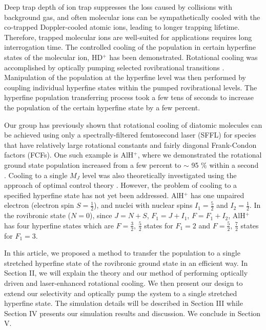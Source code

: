 \documentclass[nofootinbib,aip,jcp,reprint]{revtex4-1}
\begin{document}
Deep trap depth of ion trap suppresses the loss caused by collisions with background gas, and often molecular ions can be sympathetically cooled with the co-trapped Doppler-cooled atomic ions, leading to longer trapping lifetime. Therefore, trapped molecular ions are well-suited for applications requires long interrogation time. The controlled cooling of the population in certain hyperfine states of the molecular ion, HD$^+$ has been demonstrated\cite{bressel2012manipulation}. Rotational cooling was accomplished by optically pumping selected rovibrational transitions \cite{schneider2010all}. Manipulation of the population at the hyperfine level was then performed by coupling individual hyperfine states within the pumped rovibrational levels. The hyperfine population transferring process took a few tens of seconds to increase the population of the certain hyperfine state by a few percent.\par
Our group has previously shown that rotational cooling of diatomic molecules can be achieved using only a spectrally-filtered femtosecond laser (SFFL) for species that have relatively large rotational constants and fairly diagonal Frank-Condon factors (FCFs)\cite{lien2011optical}. One such example is AlH$^+$, where we demonstrated the rotational ground state population increased from a few percent to $\sim$ 95 $\%$ within a second \cite{lien2014broadband}. Cooling to a single $M_{J}$ level was also theoretically investigated using the approach of optimal control theory \cite{aroch2018optimizing}. However, the problem of cooling to a specified hyperfine state has not yet been addressed. AlH$^+$ has one unpaired electron (electron spin $S=\frac{1}{2}$), and nuclei with nuclear spins $I_{1}=\frac{5}{2}$ and $I_{2}=\frac{1}{2}$. In the rovibronic state ($N=0$), since $J=N+S$, $F_{1}=J+I_{1}$, $F=F_{1}+I_{2}$, AlH$^{+}$ has four hyperfine states which are $F=\frac{3}{2},\, \frac{5}{2}$ states for $F_{1}=2$ and $F=\frac{5}{2},\, \frac{7}{2}$ states for $F_{1}=3$.\par
In this article, we proposed a method to transfer the population to a single stretched hyperfine state of the rovibronic ground state in an efficient way. In Section II, we will explain the theory and our method of performing optically driven and laser-enhanced rotational cooling. We then present our design to extend our selectivity and optically pump the system to a single stretched hyperfine state. The simulation details will be described in Section III while Section IV presents our simulation results and discussion. We conclude in Section V.\par
\end{document}
